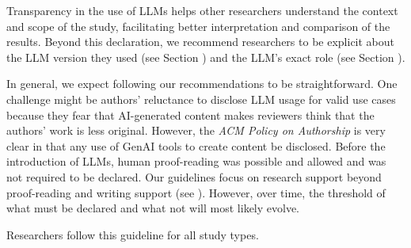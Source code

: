 
Transparency in the use of LLMs helps other researchers understand the context and scope of the study, facilitating better interpretation and comparison of the results.
Beyond this declaration, we recommend researchers to be explicit about the LLM version they used (see Section \modelversion) and the LLM's exact role (see Section \toolarchitecture).


In general, we expect following our recommendations to be straightforward.
One challenge might be authors' reluctance to disclose LLM usage for valid use cases because they fear that AI-generated content makes reviewers think that the authors' work is less original.
However, the \emph{ACM Policy on Authorship} is very clear in that any use of GenAI tools to create content \must be disclosed.
Before the introduction of LLMs, human proof-reading was possible and allowed and was not required to be declared.
Our guidelines focus on research support beyond proof-reading and writing support (see \scope).
However, over time, the threshold of what must be declared and what not will most likely evolve.


Researchers \must follow this guideline for all study types.
